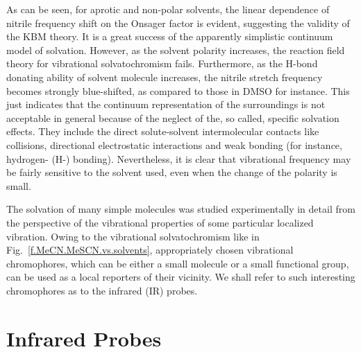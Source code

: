 \documentclass[a4paper,titlepage,twoside,fleqn,12pt]{book}
\begin{document}
\begin{refsection}
As can be seen, for aprotic and non-polar solvents, the linear dependence of
nitrile frequency shift on the Onsager factor is evident, suggesting the validity of the KBM theory.
It is a great success of the apparently simplistic continuum model of solvation. 
However, as the solvent polarity increases, the reaction field 
theory for vibrational solvatochromism fails. Furthermore, as the H-bond donating ability of 
solvent molecule increases, the nitrile stretch frequency becomes strongly blue-shifted, as 
compared to those in DMSO for instance.\citep{Wilderen.Luuk.Kern-Michler.Muller-Werkmeister.Bredenbeck.PCCP.2014}
This just indicates that the continuum representation of the surroundings is not acceptable in general
because of the neglect of the, so called, specific solvation effects. They include the direct solute-solvent intermolecular
contacts like collisions, directional electrostatic interactions and weak bonding (for instance, hydrogen- (H-) bonding).
Nevertheless, it is clear that vibrational frequency may be fairly sensitive 
to the solvent used, even when the change of the polarity is small.

The solvation of many simple molecules was studied experimentally in detail from the perspective of the 
vibrational properties of some particular localized vibration.\citep{Rowlen.Harris.AnalChem.1991,Mayne.Hudson.JPC.1991,
Janroz.Stangret.Lindgren.JACS.1993,Akiyama.Ohtani.SpectchimActA.1994,
Reimers.Hall.JACS.1999,Wilderen.Luuk.Kern-Michler.Muller-Werkmeister.Bredenbeck.PCCP.2014,Jansen.JPCB.2014} 
Owing to the vibrational solvatochromism
like in Fig.~\ref{f.MeCN.MeSCN.vs.solvents}, 
appropriately chosen vibrational chromophores, which can be either a small molecule or a small functional
group, can be used as a local reporters of their vicinity.\citep{Kim.Cho.ChemRev.2013} 
We shall refer to such interesting chromophores as to the infrared (IR) probes. 

\section{Infrared Probes}


\end{refsection}
\end{document}
